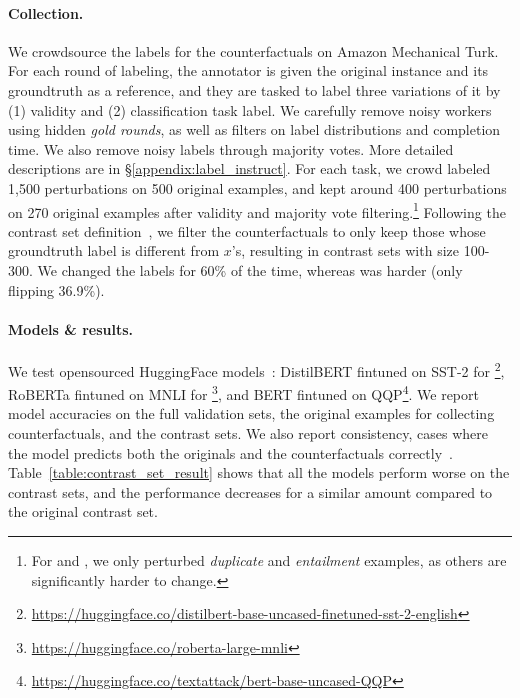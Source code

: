 \TableAugSST
\TableAugNLI

\paragraph{Collection.} 
We crowdsource the labels for the counterfactuals on Amazon Mechanical Turk. 
For each round of labeling, the annotator is given the original instance and its groundtruth as a reference, and they are tasked to label three variations of it by (1) validity and (2) classification task label. 
We carefully remove noisy workers using hidden \emph{gold rounds}, as well as filters on label distributions and completion time.
We also remove noisy labels through majority votes.
More detailed descriptions are in \S\ref{appendix:label_instruct}. 
For each task, we crowd labeled 1,500 perturbations on 500 original examples, and kept around 400 perturbations on 270 original examples after validity and majority vote filtering.\footnote{For \qqp and \nli, we only perturbed \emph{duplicate} and \emph{entailment} examples, as others are significantly harder to change.}
Following the contrast set definition~\cite{gardner2020contrast}, we filter the counterfactuals to only keep those whose groundtruth label is different from $x$'s, resulting in contrast sets with size 100-300.
We changed the \nli labels for 60\% of the time, whereas \sst was harder (only flipping 36.9\%).

\paragraph{Models \& results.}
We test opensourced HuggingFace models~\cite{Wolf2019HuggingFacesTS}:
DistilBERT fintuned on SST-2 for \sst\footnote{\url{https://huggingface.co/distilbert-base-uncased-finetuned-sst-2-english}},
RoBERTa fintuned on MNLI for \nli\footnote{\url{https://huggingface.co/roberta-large-mnli}},
and BERT fintuned on QQP\footnote{\url{https://huggingface.co/textattack/bert-base-uncased-QQP}}.
We report model accuracies on the full validation sets, the original examples for collecting counterfactuals, and the contrast sets.
We also report consistency, \ie cases where the model predicts both the originals and the counterfactuals correctly~\cite{li2020linguistically}.
Table~\ref{table:contrast_set_result} shows that all the models perform worse on the contrast sets, and the performance decreases for a similar amount compared to the original contrast set.


